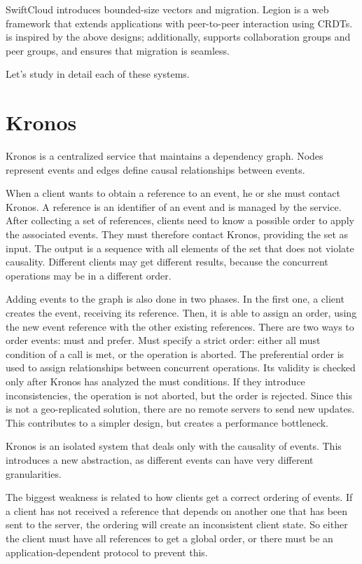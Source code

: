 SwiftCloud \cite{rep:pan:sh177} introduces bounded-size
vectors and migration.
Legion \cite{app:rep:syn:1775} is a web framework that extends applications
with peer-to-peer interaction using CRDTs.
\system{} is inspired by the above designs; additionally, \system{}
supports collaboration groups and peer groups, and ensures that
migration is seamless.

Let's study in detail each of these systems.

\section{Kronos}
\label{sec:soa:kronos}
Kronos \cite{escriva2014kronos} 
is a centralized service that maintains a dependency graph. 
Nodes represent events and edges define causal relationships between events. 

When a  client wants to obtain a reference to an event, 
he or she must contact Kronos. 
A reference is an identifier of an event and is managed by the service. 
After collecting a set of references,  clients need to know a possible order 
to apply the associated events. They must therefore contact Kronos, 
providing the set as input. 
The output is a sequence with all elements of the set that does not violate 
causality. 
Different clients may get different results, 
because the concurrent operations may be in a different order. 

Adding events to the graph is also done in two phases. 
In the first one, a client creates the event, receiving its reference. 
Then, it is able to assign an order, using the new event reference with the 
other existing references. There are two ways to order events: must and prefer. 
Must specify a strict order: either all must condition of a call is met, 
or the operation is aborted. The preferential order is used to assign 
relationships between concurrent operations. Its validity is checked only 
after Kronos has analyzed the must conditions. 
If they introduce inconsistencies, the operation is not aborted, 
but the order is rejected. Since this is not a geo-replicated solution, 
there are no remote servers to send new updates. 
This contributes to a simpler design, but creates a performance bottleneck. 

Kronos is an isolated system that deals only with the causality of events. 
This introduces a new abstraction, as different events can have very different 
granularities. 

The biggest weakness is related to how clients get a correct 
ordering of events. If a client has not received a reference that depends on 
another one that has been sent to the server, the ordering will create an 
inconsistent client state. So either the client must have all references to get 
a global order, 
or there must be an application-dependent protocol to prevent this. 

